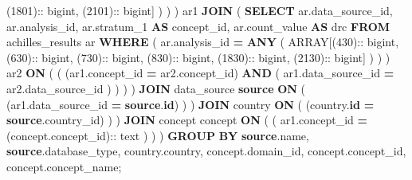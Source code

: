 \documentclass[
]{book}
\newenvironment{Shaded}{\begin{snugshade}}{\end{snugshade}}
\newcommand{\DataTypeTok}[1]{\textcolor[rgb]{0.13,0.29,0.53}{#1}}
\newcommand{\DecValTok}[1]{\textcolor[rgb]{0.00,0.00,0.81}{#1}}
\newcommand{\KeywordTok}[1]{\textcolor[rgb]{0.13,0.29,0.53}{\textbf{#1}}}
\newcommand{\NormalTok}[1]{#1}
\newcommand{\OperatorTok}[1]{\textcolor[rgb]{0.81,0.36,0.00}{\textbf{#1}}}
\begin{document}
\begin{Shaded}
\begin{Highlighting}[]
\NormalTok{                  (}\DecValTok{1801}\NormalTok{):: bigint,}
\NormalTok{                  (}\DecValTok{2101}\NormalTok{):: bigint]}
\NormalTok{                )}
\NormalTok{              )}
\NormalTok{          ) ar1}
          \KeywordTok{JOIN}\NormalTok{ (}
            \KeywordTok{SELECT}
\NormalTok{              ar.data\_source\_id,}
\NormalTok{              ar.analysis\_id,}
\NormalTok{              ar.stratum\_1 }\KeywordTok{AS}\NormalTok{ concept\_id,}
\NormalTok{              ar.count\_value }\KeywordTok{AS}\NormalTok{ drc}
            \KeywordTok{FROM}
\NormalTok{              achilles\_results ar}
            \KeywordTok{WHERE}
\NormalTok{              (}
\NormalTok{                ar.analysis\_id }\OperatorTok{=} \KeywordTok{ANY}\NormalTok{ (}
                  \DataTypeTok{ARRAY}\NormalTok{[(}\DecValTok{430}\NormalTok{):: bigint,}
\NormalTok{                  (}\DecValTok{630}\NormalTok{):: bigint,}
\NormalTok{                  (}\DecValTok{730}\NormalTok{):: bigint,}
\NormalTok{                  (}\DecValTok{830}\NormalTok{):: bigint,}
\NormalTok{                  (}\DecValTok{1830}\NormalTok{):: bigint,}
\NormalTok{                  (}\DecValTok{2130}\NormalTok{):: bigint]}
\NormalTok{                )}
\NormalTok{              )}
\NormalTok{          ) ar2 }\KeywordTok{ON}\NormalTok{ (}
\NormalTok{            (}
\NormalTok{              (ar1.concept\_id }\OperatorTok{=}\NormalTok{ ar2.concept\_id)}
              \KeywordTok{AND}\NormalTok{ (}
\NormalTok{                ar1.data\_source\_id }\OperatorTok{=}\NormalTok{ ar2.data\_source\_id}
\NormalTok{              )}
\NormalTok{            )}
\NormalTok{          )}
\NormalTok{        )}
        \KeywordTok{JOIN}\NormalTok{ data\_source }\KeywordTok{source} \KeywordTok{ON}\NormalTok{ (}
\NormalTok{          (ar1.data\_source\_id }\OperatorTok{=} \KeywordTok{source}\NormalTok{.}\KeywordTok{id}\NormalTok{)}
\NormalTok{        )}
\NormalTok{      )}
      \KeywordTok{JOIN}\NormalTok{ country }\KeywordTok{ON}\NormalTok{ (}
\NormalTok{        (country.}\KeywordTok{id} \OperatorTok{=} \KeywordTok{source}\NormalTok{.country\_id)}
\NormalTok{      )}
\NormalTok{    )}
    \KeywordTok{JOIN}\NormalTok{ concept concept }\KeywordTok{ON}\NormalTok{ (}
\NormalTok{      (}
\NormalTok{        ar1.concept\_id }\OperatorTok{=}\NormalTok{ (concept.concept\_id):: text}
\NormalTok{      )}
\NormalTok{    )}
\NormalTok{  )}
\KeywordTok{GROUP} \KeywordTok{BY}
  \KeywordTok{source}\NormalTok{.name,}
  \KeywordTok{source}\NormalTok{.database\_type,}
\NormalTok{  country.country,}
\NormalTok{  concept.domain\_id,}
\NormalTok{  concept.concept\_id,}
\NormalTok{  concept.concept\_name;}
\end{Highlighting}
\end{Shaded}
\end{document}
